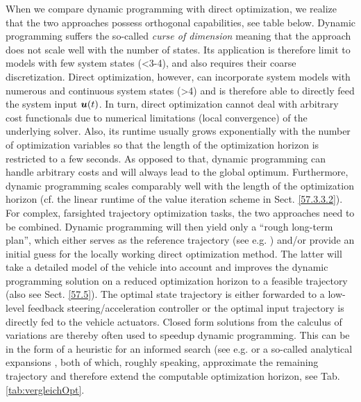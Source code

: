 When we compare dynamic programming with direct optimization, we realize that the two approaches possess orthogonal capabilities, see table below.
 Dynamic programming suffers the so-called \emph{curse of dimension} \cite{bellman_DP} %
meaning that the approach does not scale well with the number of states. Its application is therefore limit to models with few system states (<3-4), and also requires their coarse discretization. Direct optimization, however, can incorporate system models with numerous and continuous system states (>4) and is therefore able to directly feed the system input $\boldsymbol{u}(t)$. In turn, direct optimization cannot deal with arbitrary cost functionals due to numerical limitations (local convergence) of the underlying solver. Also, its runtime usually grows exponentially with the number of optimization variables so that the length of the optimization horizon is restricted to a few seconds. As opposed to that, dynamic programming can handle arbitrary costs and will always lead to the global optimum. Furthermore, dynamic programming scales comparably well with the length of the optimization horizon (cf. the linear runtime of the value iteration scheme in  Sect. \ref{57.3.3.2}). 
For complex, farsighted trajectory optimization tasks, the two approaches need to be combined. Dynamic programming will then yield only a “rough long-term plan”, which either serves as the reference trajectory (see e.g.\cite{Ferguson2008, Ferguson2008b, gu2013focused} %
) and/or provide an initial guess \cite{kang2012online} %
for the locally working direct optimization method. The latter will take a detailed model of the vehicle into account and improves the dynamic programming solution on a reduced optimization horizon to a feasible trajectory (also see  Sect. \ref{57.5}). The optimal state trajectory is either forwarded to a low-level feedback steering/acceleration controller or the optimal input trajectory is directly fed to the vehicle actuators.
Closed form solutions from the calculus of variations are thereby often used to speedup dynamic programming. This can be in the form of a heuristic for an informed search (see e.g. \cite{zieglerIV08} %
or a so-called analytical expansions \cite{dolgov2010path}, %
both of which, roughly speaking, approximate the remaining trajectory and therefore extend the computable optimization horizon, see  Tab.\,\ref{tab:vergleichOpt}.

